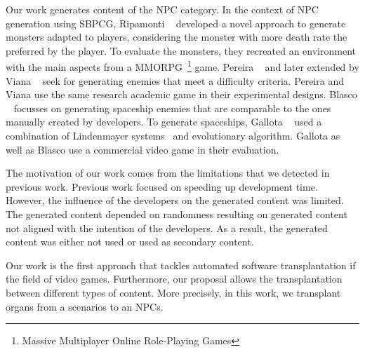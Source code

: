 Our work generates content of the NPC category. In the context of NPC generation using SBPCG, Ripamonti \etal~\cite{ripamonti2021dragon} developed a novel approach to generate monsters adapted to players, considering the monster with more death rate the preferred by the player. To evaluate the monsters, they recreated an environment with the main aspects from a MMORPG~\footnote{Massive Multiplayer Online Role-Playing Games} game. Pereira \etal~\cite{pereira2021procedural_enemies} and later extended by Viana \etal~\cite{viana2022illuminating} seek for generating enemies that meet a difficulty criteria. Pereira \etal and Viana \etal use the same research academic game in their experimental designs. 
Blasco \etal~\cite{blasco2021evolutionary} focusses on generating spaceship enemies that are comparable to the ones manually created by developers. To generate spaceships, Gallota \etal~\cite{gallotta2022evolving} used a combination of Lindenmayer systems~\cite{lindenmayer1968mathematical} and evolutionary algorithm. Gallota \etal as well as Blasco \etal use a commercial video game in their evaluation.



The motivation of our work comes from the limitations that we detected in previous work. Previous work focused on speeding up development time. However, the influence of the developers on the generated content was limited. The generated content depended on randomness resulting on generated content not aligned with the intention of the developers. As a result, the generated content was either not used or used as secondary content. 

Our work is the first approach that tackles automated software transplantation if the field of video games. Furthermore, our proposal allows the transplantation between different types of content. More precisely, in this work, we transplant organs from a scenarios to an NPCs.


